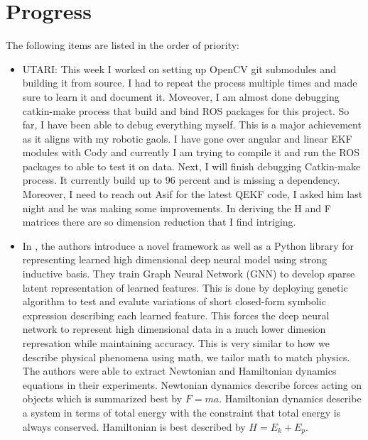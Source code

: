 \documentclass[11pt]{article}
\begin{document}
\section{Progress}
The following items are listed in the order of priority:
\begin{itemize}
      \item UTARI: This week I worked on setting up OpenCV git submodules and building it from source.
      I had to repeat the process multiple times and made sure to learn it and document it.
      Moveover, I am almost done debugging catkin-make process that build and bind ROS packages for this project.
      So far, I have been able to debug everything myself.
      This is a major achievement as it aligns with my robotic gaols.
      I have gone over angular and linear EKF modules with Cody and currently I am
      trying to compile it and run the ROS packages to able to test it on data.
      Next, I will finish debugging Catkin-make process.
      It  currently build up to 96 percent and is missing a dependency. Moreover, I need to reach out Asif for the latest QEKF code, I asked him last night and he was making some improvements. In deriving the H and F matrices there are so dimension reduction that I find intriging.

      \item In \cite{cranmer2020discovering}, the authors introduce a novel framework as well as a Python library for representing learned high dimensional deep neural model using strong inductive basis. They train Graph Neural Network (GNN) to develop sparse latent representation of learned features. This is done by deploying genetic algorithm to test and evalute variations of short closed-form symbolic expression describing each learned feature. This forces the deep neural network to represent high dimensional data in a much lower dimesion represation while maintaining accuracy. This is very similar to how we describe physical phenomena using math, we tailor math to match physics. The authors were able to extract Newtonian and Hamiltonian dynamics equations in their experiments. Newtonian dynamics describe forces acting on objects which is summarized best by $F=ma$. Hamiltonian dynamics describe a system in terms of total energy with the constraint that total energy is always conserved. Hamiltonian is best described by $H=E_k+E_p$.


\end{itemize}
\end{document}
